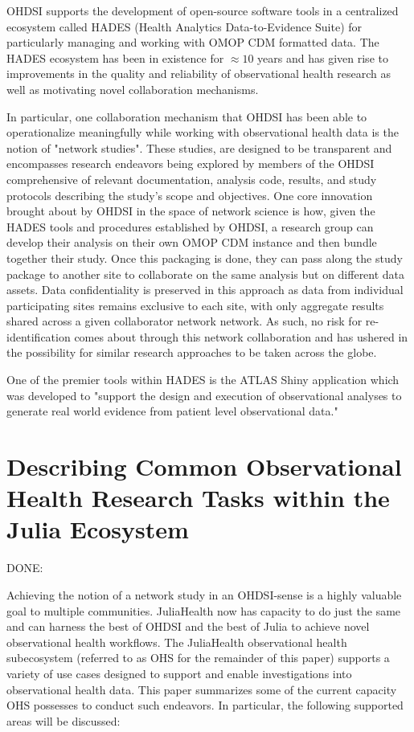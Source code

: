 \documentclass{juliacon}
\begin{document}
OHDSI supports the development of open-source software tools in a centralized ecosystem called HADES (Health Analytics Data-to-Evidence Suite) for particularly managing and working with OMOP CDM formatted data.
The HADES ecosystem has been in existence for $\approx 10$ years and has given rise to improvements in the quality and reliability of observational health research as well as motivating novel collaboration mechanisms.

In particular, one collaboration mechanism that OHDSI has been able to operationalize meaningfully while working with observational health data is the notion of "network studies".
These studies, are designed to be transparent and encompasses research endeavors being explored by members of the OHDSI comprehensive of relevant documentation, analysis code, results, and study protocols describing the study's scope and objectives.
One core innovation brought about by OHDSI in the space of network science is how, given the HADES tools and procedures established by OHDSI, a research group can develop their analysis on their own OMOP CDM instance and then bundle together their study.
Once this packaging is done, they can pass along the study package to another site to collaborate on the same analysis but on different data assets.
Data confidentiality is preserved in this approach as data from individual participating sites remains exclusive to each site, with only aggregate results shared across a given collaborator network network.
As such, no risk for re-identification comes about through this network collaboration and has ushered in the possibility for similar research approaches to be taken across the globe. \cite{ohdsi2019book}

One of the premier tools within HADES is the ATLAS Shiny application which was developed to "support the design and execution of observational analyses to generate real world evidence from patient level observational data."

\section{Describing Common Observational Health Research Tasks within the Julia Ecosystem}

DONE: 

Achieving the notion of a network study in an OHDSI-sense is a highly valuable goal to multiple communities.
JuliaHealth now has capacity to do just the same and can harness the best of OHDSI and the best of Julia to achieve novel observational health workflows.
The JuliaHealth observational health subecosystem (referred to as OHS for the remainder of this paper) supports a variety of use cases designed to support and enable investigations into observational health data.
This paper summarizes some of the current capacity OHS possesses to conduct such endeavors.
In particular, the following supported areas will be discussed:
\end{document}
